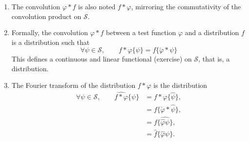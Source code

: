 \begin{remark}
  \begin{enumerate}
    \item The convolution $\varphi * f$ is also noted $f * \varphi$, mirroring the commutativity of the convolution 
      product on $\mathcal{S}$.
    \item Formally, the convolution $\varphi * f$ between a test function $\varphi$ and a distribution $f$ is a 
      distribution such that
    \begin{equation*}
      \forall \psi \in \mathcal{S}, \qquad f*\varphi\{\psi\} = f\{\check{\varphi}*\psi\}
    \end{equation*}
    This defines a continuous and linear functional (exercise) on $\mathcal{S}$, that is, a distribution.
    \item The Fourier transform of the distribution $f * \varphi$ is the distribution
      \begin{align*}
	\forall \psi \in \mathcal{S}, \qquad \widehat{f*\varphi}\{\psi\} &= f*\varphi\{\hat{\psi}\}, \\
	&= f\{\check{\varphi}*\hat{\psi}\}, \\
	&= f\{\widehat{\hat{\varphi}\psi}\}, \\
	&= \hat{f}\{\hat{\varphi}\psi\}.
      \end{align*}
  \end{enumerate}
\end{remark}

